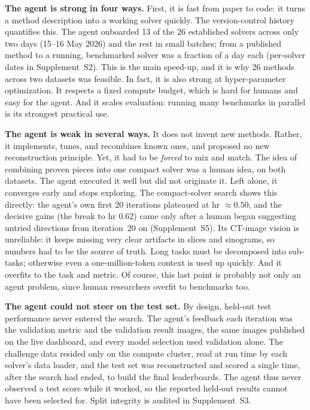 \documentclass[AMA,twocolumn]{USG} %
\begin{document}
\textbf{The agent is strong in four ways.} First, it is fast from paper to code: it turns a method description into a working solver quickly. The version-control history quantifies this. The agent onboarded 13 of the 26 established solvers across only two days (15--16 May 2026) and the rest in small batches; from a published method to a running, benchmarked solver was a fraction of a day each (per-solver dates in Supplement~S2). This is the main speed-up, and it is why 26 methods across two datasets was feasible. In fact, it is also strong at hyper-parameter optimization. It respects a fixed compute budget, which is hard for humans and easy for the agent. And it scales evaluation: running many benchmarks in parallel is its strongest practical use.

\textbf{The agent is weak in several ways.} It does not invent new methods. Rather, it implements, tunes, and recombines known ones, and proposed no new reconstruction principle. Yet, it had to be \emph{forced} to mix and match. The idea of combining proven pieces into one compact solver was a human idea, on both datasets. The agent executed it well but did not originate it. Left alone, it converges early and stops exploring. The compact-solver search shows this directly: the agent's own first 20 iterations plateaued at hr $\approx0.50$, and the decisive gains (the break to hr 0.62) came only after a human began suggesting untried directions from iteration~20 on (Supplement~S5). Its CT-image vision is unreliable: it keeps missing very clear artifacts in slices and sinograms, so numbers had to be the source of truth. Long tasks must be decomposed into sub-tasks; otherwise even a one-million-token context is used up quickly. And it overfits to the task and metric. Of course, this last point is probably not only an agent problem, since human researchers overfit to benchmarks too.

\textbf{The agent could not steer on the test set.} By design, held-out test performance never entered the search. The agent's feedback each iteration was the validation metric and the validation result images, the same images published on the live dashboard, and every model selection used validation alone. The challenge data resided only on the compute cluster, read at run time by each solver's data loader, and the test set was reconstructed and scored a single time, after the search had ended, to build the final leaderboards. The agent thus never observed a test score while it worked, so the reported held-out results cannot have been selected for. Split integrity is audited in Supplement~S3.
\end{document}
